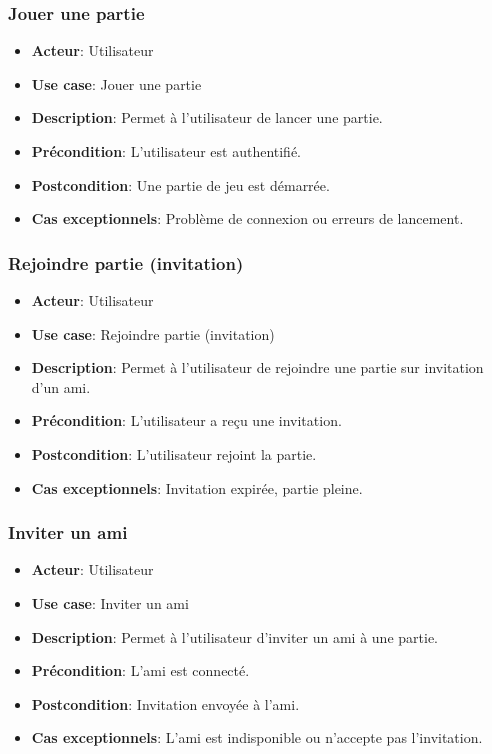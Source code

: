 \documentclass{article}
\begin{document}
\subsubsection*{Jouer une partie}
\begin{itemize}
    \item \textbf{Acteur}: Utilisateur
    \item \textbf{Use case}: Jouer une partie
    \item \textbf{Description}: Permet à l'utilisateur de lancer une partie.
    \item \textbf{Précondition}: L'utilisateur est authentifié.
    \item \textbf{Postcondition}: Une partie de jeu est démarrée.
    \item \textbf{Cas exceptionnels}: Problème de connexion ou erreurs de lancement.
\end{itemize}

\subsubsection*{Rejoindre partie (invitation)}
\begin{itemize}
    \item \textbf{Acteur}: Utilisateur
    \item \textbf{Use case}: Rejoindre partie (invitation)
    \item \textbf{Description}: Permet à l'utilisateur de rejoindre une partie sur invitation d'un ami.
    \item \textbf{Précondition}: L'utilisateur a reçu une invitation.
    \item \textbf{Postcondition}: L'utilisateur rejoint la partie.
    \item \textbf{Cas exceptionnels}: Invitation expirée, partie pleine.
\end{itemize}

\subsubsection*{Inviter un ami}
\begin{itemize}
    \item \textbf{Acteur}: Utilisateur
    \item \textbf{Use case}: Inviter un ami
    \item \textbf{Description}: Permet à l'utilisateur d'inviter un ami à une partie.
    \item \textbf{Précondition}: L'ami est connecté.
    \item \textbf{Postcondition}: Invitation envoyée à l'ami.
    \item \textbf{Cas exceptionnels}: L'ami est indisponible ou n'accepte pas l'invitation.
\end{itemize}
\end{document}
